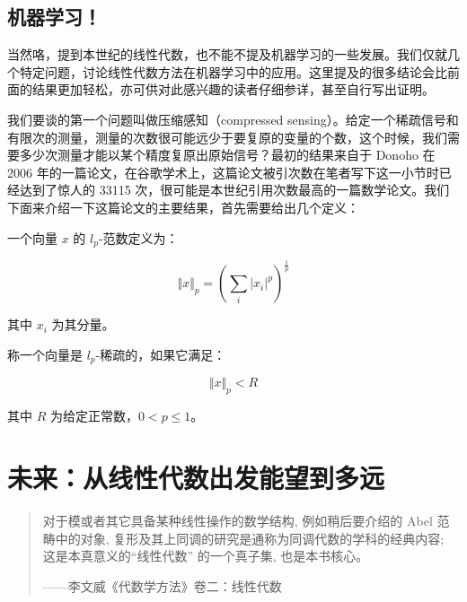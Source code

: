 \subsection{机器学习！}

当然咯，提到本世纪的线性代数，也不能不提及机器学习的一些发展。我们仅就几个特定问题，讨论线性代数方法在机器学习中的应用。这里提及的很多结论会比前面的结果更加轻松，亦可供对此感兴趣的读者仔细参详，甚至自行写出证明。

我们要谈的第一个问题叫做压缩感知（compressed sensing）。给定一个稀疏信号和有限次的测量，测量的次数很可能远少于要复原的变量的个数，这个时候，我们需要多少次测量才能以某个精度复原出原始信号？最初的结果来自于 Donoho 在 2006 年的一篇论文，在谷歌学术上，这篇论文被引次数在笔者写下这一小节时已经达到了惊人的 33115 次，很可能是本世纪引用次数最高的一篇数学论文。我们下面来介绍一下这篇论文的主要结果，首先需要给出几个定义：

\begin{definition}
    一个向量 $x$ 的 $l_p$-范数定义为：

    \[
    \Vert x \Vert_p = \left( \sum_{i}|x_i|^p \right)^{\frac{1}{p}}
    \]

    其中 $x_i$ 为其分量。
\end{definition}

\begin{definition}
    称一个向量是 $l_p$-稀疏的，如果它满足：

    \[
    \Vert x \Vert_p < R
    \]

    其中 $R$ 为给定正常数，$0 < p \leqslant 1$。
\end{definition}



\section{未来：从线性代数出发能望到多远}

\begin{quote}

\kaishu
对于模或者其它具备某种线性操作的数学结构, 例如稍后要介绍的 Abel 范畴中的对象, 复形及其上同调的研究是通称为同调代数的学科的经典内容; 这是本真意义的“线性代数” 的一个真子集, 也是本书核心。

\begin{flushright}
    \kaishu
    ——李文威《代数学方法》卷二：线性代数
\end{flushright}
    
\end{quote}


